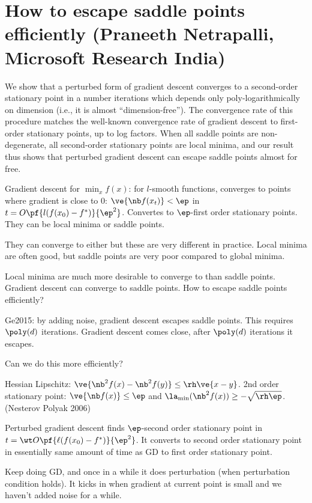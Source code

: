 \section{How to escape saddle points efficiently (Praneeth Netrapalli, Microsoft Research India)}

We show that a perturbed form of gradient descent converges to a second-order stationary point in a number iterations which depends only poly-logarithmically on dimension (i.e., it is almost ``dimension-free''). The convergence rate of this procedure matches the well-known convergence rate of gradient descent to first-order stationary points, up to log factors. When all saddle points are non-degenerate, all second-order stationary points are local minima, and our result thus shows that perturbed gradient descent can escape saddle points almost for free.

Gradient descent for $\min_x f(x)$: for $l$-smooth functions, converges to points where gradient is close to 0:
$\ve{\nb f(x_t)}<\ep$ in $t=O\pf{l(f(x_0)-f^*)}{\ep^2}$. Convertes to $\ep$-first order stationary points. They can be local minima or saddle points. 

They can converge to either but these are very different in practice. Local minima are often good, but saddle points are very poor compared to global minima. 

Local minima are much more desirable to converge to than saddle points. Gradient descent can converge to saddle points. How to escape saddle points efficiently?

Ge2015: by adding noise, gradient descent escapes saddle points. This requires $\poly(d)$ iterations. Gradient descent comes close, after $\poly(d)$ iterations it escapes. 

Can we do this more efficiently?

Hessian Lipschitz: $\ve{\nb^2f(x)-\nb^2f(y)}\le \rh\ve{x-y}$. 
2nd order stationary point: $\ve{\nb f(x)}\le \ep$ and $\la_{\min}(\nb^2 f(x))\ge -\sqrt{\rh\ep}$. 
(Nesterov Polyak 2006)

Perturbed gradient descent finds $\ep$-second order stationary point in $t=\wt O\pf{\ell (f(x_0) - f^*)}{\ep^2}$. It converts to second order stationary point in essentially same amount of time as GD to first order stationary point.

Keep doing GD, and once in a while it does perturbation (when perturbation condition holds). It kicks in when gradient at current point is small and we haven't added noise for a while. 

